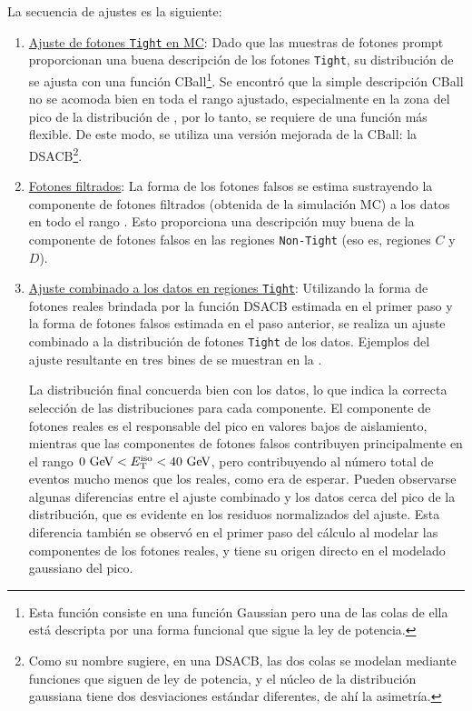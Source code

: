 La secuencia de ajustes es la siguiente:
\begin{enumerate}
    \item \underline{Ajuste de fotones \texttt{Tight} en \ac{MC}}: Dado que las muestras de fotones prompt proporcionan una buena descripción de los fotones \texttt{Tight}, su distribución de \etiso se ajusta con una función \ac{CBall}\footnote{Esta función consiste en una función Gaussian pero una de las colas de ella está descripta por una forma funcional que sigue la ley de potencia.}. Se encontró que la simple descripción \ac{CBall} no se acomoda bien en toda el rango ajustado, especialmente en la zona del pico de la distribución de \etiso, por lo tanto, se requiere de una función más flexible. De este modo, se utiliza una versión mejorada de la \ac{CBall}: la \ac{DSACB}\footnote{Como su nombre sugiere, en una \ac{DSACB}, las dos colas se modelan mediante funciones que siguen de ley de potencia, y el núcleo de la distribución gaussiana tiene dos desviaciones estándar diferentes, de ahí la asimetría.}.
    \item \underline{Fotones filtrados}: La forma de los fotones falsos se estima sustrayendo la componente de fotones filtrados (obtenida de la simulación \ac{MC}) a los datos en todo el rango \etiso. Esto proporciona una descripción muy buena de la componente de fotones falsos en las regiones \texttt{Non-Tight} (eso es, regiones \(C\) y \(D\)).
    \item \underline{Ajuste combinado a los datos en regiones \texttt{Tight}}: Utilizando la forma de fotones reales brindada por la función \ac{DSACB} estimada en el primer paso y la forma de fotones falsos estimada en el paso anterior, se realiza un ajuste combinado a la distribución \etiso de fotones \texttt{Tight} de los datos. Ejemplos del ajuste resultante en tres bines de \pt se muestran en la \Fig{\ref{fig:bkg:estimation:fits_tightID_data}}.
    
        La distribución final concuerda bien con los datos, lo que indica la correcta selección de las distribuciones para cada componente. El componente de fotones reales es el responsable del pico en valores bajos de aislamiento, mientras que las componentes de fotones falsos contribuyen principalmente en el rango \(0~\text{GeV} < E_{\text{T}}^{\text{iso}} < 40 ~\text{GeV}\), pero contribuyendo al número total de eventos mucho menos que los reales, como era de esperar. Pueden observarse algunas diferencias entre el ajuste combinado y los datos cerca del pico de la distribución, que es evidente en los residuos normalizados del ajuste. Esta diferencia también se observó en el primer paso del cálculo al modelar las componentes de los fotones reales, y tiene su origen directo en el modelado gaussiano del pico.


\end{enumerate}
